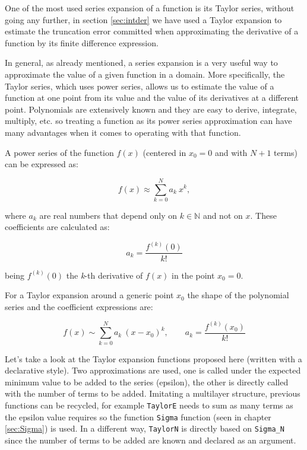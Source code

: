 One of the most used series expansion of a function is its Taylor series, without going any further, in section \ref{sec:intder} we have used 
a Taylor expansion to estimate the truncation error committed when approximating the derivative of a function by its finite difference 
expression.

In general, as already mentioned, a series expansion is a very useful way to approximate the value of a given function in a domain. More 
specifically, the Taylor series, which uses power series, allows us to estimate the value of a function at one point from its value and the 
value of its derivatives at a different point. Polynomials are extensively known and they are easy to derive, integrate, multiply, etc. so 
treating a function as its power series approximation can have many advantages when it comes to operating with that function.

A power series of the function $f(x)$ (centered in $x_0 = 0$ and with $N+1$ terms) can be expressed as:
 
\[  f(x) \approx \sum_{k=0} ^N a_k \  x^k,  \] 

where $a_k$ are real numbers that depend only on $k\in \mathbb{N}$ and not on $x$. These coefficients are calculated as:

$$
a_k = \frac{  f^{(k)} (0)  }{ k! }  
$$

being $f^{(k)} (0)$ the \textit{k}-th derivative of $f(x)$ in the point $x_0 = 0$.
 
For a Taylor expansion around a generic point $x_0$ the shape of the polynomial series and the coefficient expressions are:

\[  f(x) \sim \sum_{k=0} ^N a_k \  (x - x_0)^k, \qquad a_k = \frac{  f^{(k)} (x_0)  }{ k! }   \] 





Let's take a look at the Taylor expansion functions proposed here (written with a declarative style). Two approximations are used, one is 
called under the expected minimum value to be added to the series (epsilon), the other is directly called with the number of terms to be 
added. Imitating a multilayer structure, previous functions can be recycled, for example \texttt{TaylorE} needs to sum as many terms as the 
epsilon value requires so the function \texttt{Sigma} function (seen in chapter \ref{sec:Sigma}) is used. In a different way, 
\texttt{TaylorN} is directly based on \texttt{Sigma\_N} since the number of terms to be added are known and declared as an argument.

